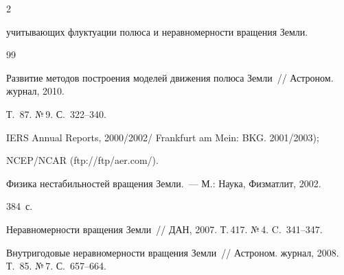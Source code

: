 \begin{multicols}{2}
\begin{enumerate}[(1)]
учитывающих флуктуации полюса и неравномерности вращения Земли.


\end{enumerate}


{\small\frenchspacing


{%




\begin{thebibliography}{99}









Развитие методов построения моделей движения полюса Земли~// Астроном. журнал, 2010.


Т.~87. №\,9. С.~322--340.







IERS Annual Reports, 2000/2002/ Frankfurt am Mein: BKG. 2001/2003); 


NCEP/NCAR ({\sf ftp://ftp/aer.com/}).










 Физика нестабильностей вращения Земли.~--- М.: Наука, Физматлит, 2002. 


384~с.









Неравномерности вращения Земли~// ДАН, 2007. Т.\,417. №\,4. C.~341--347.









Внутригодовые неравномерности вращения Земли~// Астроном. журнал, 2008. Т.~85. №\,7. С.~657--664.










\end{thebibliography}}}
\end{multicols}

